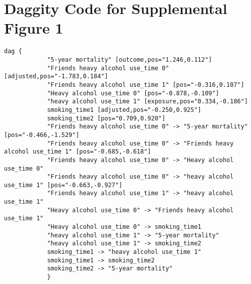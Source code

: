 \documentclass{article}
\begin{document}
\section*{Daggity Code for Supplemental Figure 1}
\begin{lstlisting}[frame=single, basicstyle=\ttfamily, linewidth=23.5cm]
        dag {
            "5-year mortality" [outcome,pos="1.246,0.112"]
            "Friends heavy alcohol use_time 0" [adjusted,pos="-1.783,0.184"]
            "Friends heavy alcohol use_time 1" [pos="-0.316,0.107"]
            "Heavy alcohol use_time 0" [pos="-0.878,-0.109"]
            "heavy alcohol use_time 1" [exposure,pos="0.334,-0.186"]
            smoking_time1 [adjusted,pos="-0.250,0.925"]
            smoking_time2 [pos="0.709,0.920"]
            "Friends heavy alcohol use_time 0" -> "5-year mortality" [pos="-0.466,-1.529"]
            "Friends heavy alcohol use_time 0" -> "Friends heavy alcohol use_time 1" [pos="-0.685,-0.618"]
            "Friends heavy alcohol use_time 0" -> "Heavy alcohol use_time 0"
            "Friends heavy alcohol use_time 0" -> "heavy alcohol use_time 1" [pos="-0.663,-0.927"]
            "Friends heavy alcohol use_time 1" -> "heavy alcohol use_time 1"
            "Heavy alcohol use_time 0" -> "Friends heavy alcohol use_time 1"
            "Heavy alcohol use_time 0" -> smoking_time1
            "heavy alcohol use_time 1" -> "5-year mortality"
            "heavy alcohol use_time 1" -> smoking_time2
            smoking_time1 -> "heavy alcohol use_time 1"
            smoking_time1 -> smoking_time2
            smoking_time2 -> "5-year mortality"
            }
\end{lstlisting}
    

    
    
\end{document}
